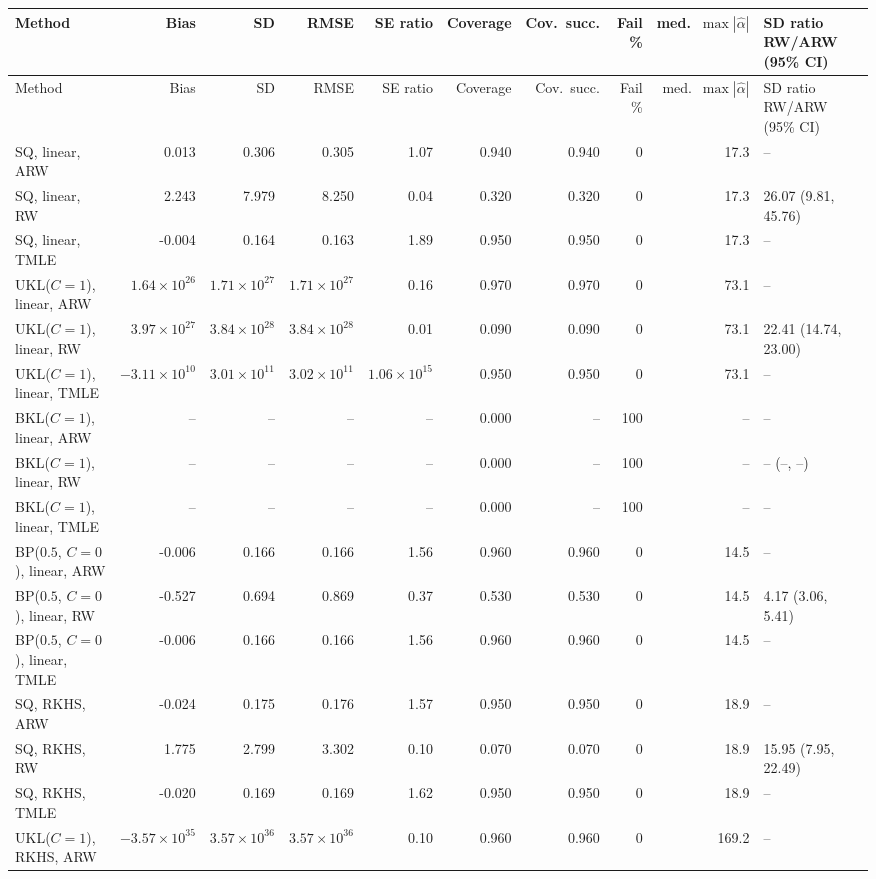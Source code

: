 \begin{tabular}{lrrrrrrrrl}
\hline
Method & Bias & SD & RMSE & SE ratio & Coverage & Cov.\ succ. & Fail \% & med.\ $\max|\widehat\alpha|$ & SD ratio RW/ARW (95\% CI) \\
\hline
\endfirsthead
\hline
Method & Bias & SD & RMSE & SE ratio & Coverage & Cov.\ succ. & Fail \% & med.\ $\max|\widehat\alpha|$ & SD ratio RW/ARW (95\% CI) \\
\hline
\endhead
SQ, linear, ARW & 0.013 & 0.306 & 0.305 & 1.07 & 0.940 & 0.940 & 0 & 17.3 & -- \\
SQ, linear, RW & 2.243 & 7.979 & 8.250 & 0.04 & 0.320 & 0.320 & 0 & 17.3 & 26.07 (9.81, 45.76) \\
SQ, linear, TMLE & -0.004 & 0.164 & 0.163 & 1.89 & 0.950 & 0.950 & 0 & 17.3 & -- \\
UKL($C=1$), linear, ARW & $1.64\times10^{26}$ & $1.71\times10^{27}$ & $1.71\times10^{27}$ & 0.16 & 0.970 & 0.970 & 0 & 73.1 & -- \\
UKL($C=1$), linear, RW & $3.97\times10^{27}$ & $3.84\times10^{28}$ & $3.84\times10^{28}$ & 0.01 & 0.090 & 0.090 & 0 & 73.1 & 22.41 (14.74, 23.00) \\
UKL($C=1$), linear, TMLE & $-3.11\times10^{10}$ & $3.01\times10^{11}$ & $3.02\times10^{11}$ & $1.06\times10^{15}$ & 0.950 & 0.950 & 0 & 73.1 & -- \\
BKL($C=1$), linear, ARW & -- & -- & -- & -- & 0.000 & -- & 100 & -- & -- \\
BKL($C=1$), linear, RW & -- & -- & -- & -- & 0.000 & -- & 100 & -- & -- (--, --) \\
BKL($C=1$), linear, TMLE & -- & -- & -- & -- & 0.000 & -- & 100 & -- & -- \\
BP($0.5$, $C=0$), linear, ARW & -0.006 & 0.166 & 0.166 & 1.56 & 0.960 & 0.960 & 0 & 14.5 & -- \\
BP($0.5$, $C=0$), linear, RW & -0.527 & 0.694 & 0.869 & 0.37 & 0.530 & 0.530 & 0 & 14.5 & 4.17 (3.06, 5.41) \\
BP($0.5$, $C=0$), linear, TMLE & -0.006 & 0.166 & 0.166 & 1.56 & 0.960 & 0.960 & 0 & 14.5 & -- \\
SQ, RKHS, ARW & -0.024 & 0.175 & 0.176 & 1.57 & 0.950 & 0.950 & 0 & 18.9 & -- \\
SQ, RKHS, RW & 1.775 & 2.799 & 3.302 & 0.10 & 0.070 & 0.070 & 0 & 18.9 & 15.95 (7.95, 22.49) \\
SQ, RKHS, TMLE & -0.020 & 0.169 & 0.169 & 1.62 & 0.950 & 0.950 & 0 & 18.9 & -- \\
UKL($C=1$), RKHS, ARW & $-3.57\times10^{35}$ & $3.57\times10^{36}$ & $3.57\times10^{36}$ & 0.10 & 0.960 & 0.960 & 0 & 169.2 & -- \\

\end{tabular}
